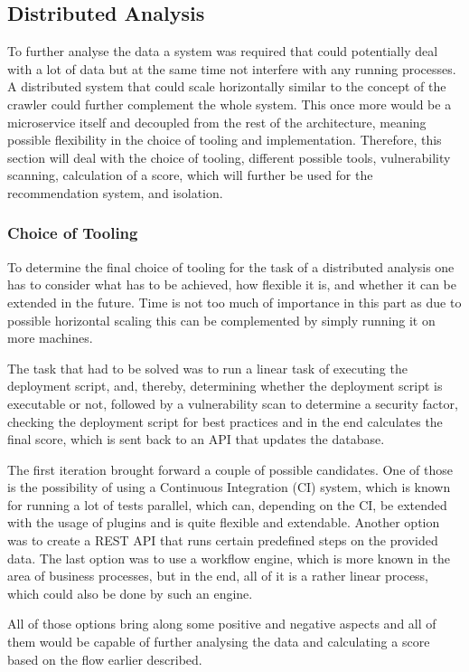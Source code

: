 \subsection{Distributed Analysis}
To further analyse the data a system was required that could potentially deal with a lot of data but at the same time not interfere with any running processes. A distributed system that could scale horizontally similar to the concept of the crawler could further complement the whole system. This once more would be a microservice itself and decoupled from the rest of the architecture, meaning possible flexibility in the choice of tooling and implementation. Therefore, this section will deal with the choice of tooling, different possible tools, vulnerability scanning, calculation of a score, which will further be used for the recommendation system, and isolation.

\subsubsection{Choice of Tooling}
To determine the final choice of tooling for the task of a distributed analysis one has to consider what has to be achieved, how flexible it is, and whether it can be extended in the future. Time is not too much of importance in this part as due to possible horizontal scaling this can be complemented by simply running it on more machines.

The task that had to be solved was to run a linear task of executing the deployment script, and, thereby, determining whether the deployment script is executable or not, followed by a vulnerability scan to determine a security factor, checking the deployment script for best practices and in the end calculates the final score, which is sent back to an API that updates the database.

The first iteration brought forward a couple of possible candidates. One of those is the possibility of using a Continuous Integration (CI) system, which is known for running a lot of tests parallel, which can, depending on the CI, be extended with the usage of plugins and is quite flexible and extendable. Another option was to create a REST API that runs certain predefined steps on the provided data. The last option was to use a workflow engine, which is more known in the area of business processes, but in the end, all of it is a rather linear process, which could also be done by such an engine.

All of those options bring along some positive and negative aspects and all of them would be capable of further analysing the data and calculating a score based on the flow earlier described.

